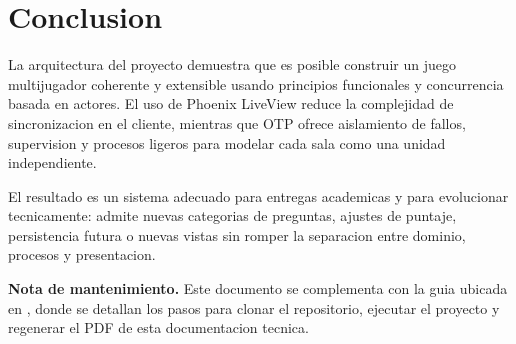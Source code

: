 \documentclass[12pt,a4paper]{article}
\begin{document}
\section{Conclusion}

La arquitectura del proyecto demuestra que es posible construir un juego
multijugador coherente y extensible usando principios funcionales y
concurrencia basada en actores. El uso de Phoenix LiveView reduce la complejidad
de sincronizacion en el cliente, mientras que OTP ofrece aislamiento de fallos,
supervision y procesos ligeros para modelar cada sala como una unidad
independiente.

El resultado es un sistema adecuado para entregas academicas y para evolucionar
tecnicamente: admite nuevas categorias de preguntas, ajustes de puntaje,
persistencia futura o nuevas vistas sin romper la separacion entre dominio,
procesos y presentacion.

\vspace{1cm}
\noindent\textbf{Nota de mantenimiento.} Este documento se complementa con la
guia ubicada en , donde se detallan los
pasos para clonar el repositorio, ejecutar el proyecto y regenerar el PDF de
esta documentacion tecnica.
\end{document}
